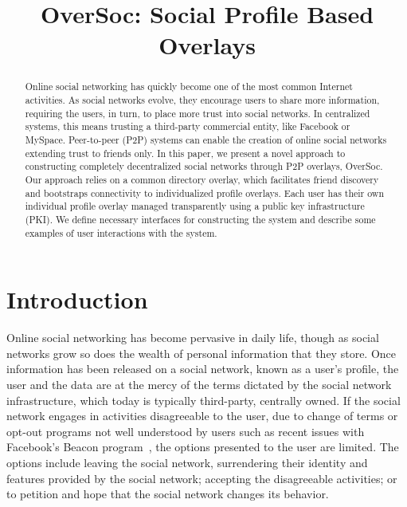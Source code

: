 \documentclass{IEEEtran}
\begin{document}

\title{OverSoc: Social Profile Based Overlays}

\author{
}

\maketitle

\begin{abstract}

Online social networking has quickly become one of the most common Internet
activities.  As social networks evolve, they encourage users to share more
information, requiring the users, in turn, to place more trust into social
networks.  In centralized systems, this means trusting a third-party commercial
entity, like Facebook or MySpace.  Peer-to-peer (P2P) systems can enable the
creation of online social networks extending trust to friends only.  In this
paper, we present a novel approach to constructing completely decentralized
social networks through P2P overlays, OverSoc.  Our approach relies on a common
directory overlay, which facilitates friend discovery and bootstraps
connectivity to individualized profile overlays.  Each user has their own
individual profile overlay managed transparently using a public key
infrastructure (PKI).  We define necessary interfaces for constructing the
system and describe some examples of user interactions with the system.

\end{abstract}

\section{Introduction}

Online social networking has become pervasive in daily life, though as social
networks grow so does the wealth of personal information that they store.
Once information has been released on a social network, known as a user's
profile, the user and the data are at the mercy of the terms dictated by the
social network infrastructure, which today is typically third-party, centrally
owned.  If the social network engages in activities disagreeable to the user,
due to change of terms or opt-out programs not well understood by users such
as recent issues with Facebook's Beacon program~\cite{facebook_beacon}, the
options presented to the user are limited.  The options include leaving the
social network, surrendering their identity and features provided by the social
network; accepting the disagreeable activities; or to petition and hope that
the social network changes its behavior. 
\end{document}
